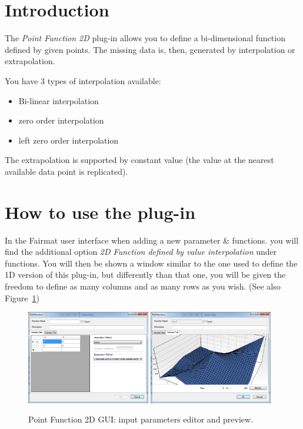 \newcommand{\pluginName}{Point Function 2D}
\newcommand{\pluginVersion}{1.0.0}



\section{Introduction}
The \emph{Point Function 2D} plug-in allows you to define a bi-dimensional function defined by given points. The missing data is, then, generated by interpolation or extrapolation.

You have 3 types of interpolation available:
\begin{itemize}
\item Bi-linear interpolation
\item zero order interpolation
\item left zero order interpolation
\end{itemize}

The extrapolation is supported by constant value (the value at the nearest available data point is replicated).

\section{How to use the plug-in}
In the Fairmat user interface when adding a new parameter \& functions.
you will find the additional option \emph{2D Function defined by value interpolation} under functions.
You will then be shown a window similar to the one used to define the 1D version of this plug-in, but differently than that one, you will be given the freedom to define as many columns and as many rows as you wish. (See also Figure~\ref{fig.PFunction2DGUI})

\begin{figure}[h]
\begin{center}
\includegraphics[width=0.48\textwidth]{./images/PFunction2DEdit.png}
\includegraphics[width=0.48\textwidth]{./images/PFunction2DPreview.png}
\caption{Point Function 2D GUI: input parameters editor and preview.}
\label{fig.PFunction2DGUI}
\end{center}
\end{figure}

